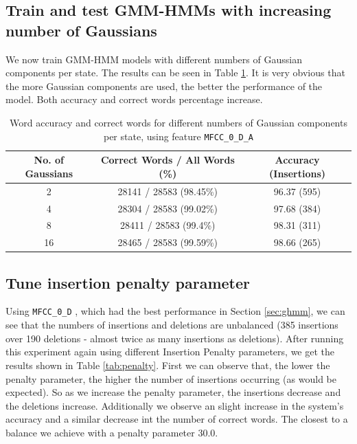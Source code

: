 \documentclass[12pt,a4paper,oneside]{article}
\begin{document}
\subsection{Train and test GMM-HMMs with increasing number of Gaussians}
We now train GMM-HMM models with different numbers of Gaussian components per state. The results can be seen in Table \ref{tab:results2}. It is very obvious that the more Gaussian components are used, the better the performance of the model. Both accuracy and correct words percentage increase.

\begin{table} 
\caption{Word accuracy and correct words for different numbers of Gaussian components per state, using feature \texttt{MFCC\_0\_D\_A} } \label{tab:results2}
    \begin{tabular}{|c|c|c|}
    \hline
    No. of Gaussians & Correct Words / All Words (\%) & Accuracy (Insertions) \\ \hline
    2                & 28141 / 28583 (98.45\%)        & 96.37 (595)           \\ \hline
    4                & 28304 / 28583 (99.02\%)        & 97.68 (384)           \\ \hline
    8                & 28411 / 28583 (99.4\%)         & 98.31 (311)           \\ \hline
    16               & 28465 / 28583 (99.59\%)        & 98.66 (265)           \\ \hline
    \end{tabular}
\end{table}

\subsection{Tune insertion penalty parameter}
Using \texttt{MFCC\_0\_D} , which had the best performance in Section \ref{sec:ghmm}, we can see that the numbers of insertions and deletions are unbalanced (385 insertions over 190 deletions - almost twice as many insertions as deletions). After running this experiment again using different Insertion Penalty parameters, we get the results shown in Table \ref{tab:penalty}. First we can observe that, the lower the penalty parameter, the higher the number of insertions occurring (as would be expected). So as we increase the penalty parameter, the insertions decrease and the deletions increase. Additionally we observe an slight increase in the system's accuracy and a similar decrease int the number of correct words. The closest to a balance we achieve with a penalty parameter 30.0.
\end{document}
